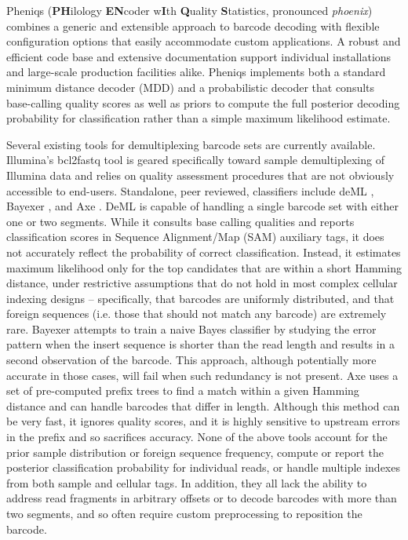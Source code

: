 \documentclass[twocolumn]{bmcart}
\begin{document}
Pheniqs (\textbf{PH}ilology \textbf{EN}coder w\textbf{I}th \textbf{Q}uality \textbf{S}tatistics, pronounced \textit{phoenix}) combines a generic and extensible approach to barcode decoding with flexible configuration options that easily accommodate custom applications. A robust and efficient code base and extensive documentation support individual installations and large-scale production facilities alike. Pheniqs implements both a standard minimum distance decoder (MDD) and a probabilistic decoder that consults base-calling quality scores as well as priors to compute the full posterior decoding probability for classification rather than a simple maximum likelihood estimate.

Several existing tools for demultiplexing barcode sets are currently available. Illumina's bcl2fastq tool is geared specifically toward sample demultiplexing of Illumina data and relies on quality assessment procedures that are not obviously accessible to end-users. Standalone, peer reviewed, classifiers include deML \cite{doi:10.1093/bioinformatics/btu719}, Bayexer \cite{doi:10.1093/bioinformatics/btv501}, and Axe \cite{doi:10.1093/bioinformatics/bty432}. DeML is capable of handling a single barcode set with either one or two segments. While it consults base calling qualities and reports classification scores in Sequence Alignment/Map (SAM) \cite{doi:10.1093/bioinformatics/btp352} auxiliary tags, it does not accurately reflect the probability of correct classification. Instead, it estimates maximum likelihood only for the top candidates that are within a short Hamming distance, under restrictive assumptions that do not hold in most complex cellular indexing designs -- specifically, that barcodes are uniformly distributed, and that foreign sequences (i.e. those that should not match any barcode) are extremely rare. Bayexer attempts to train a naive Bayes classifier by studying the error pattern when the insert sequence is shorter than the read length and results in a second observation of the barcode. This approach, although potentially more accurate in those cases, will fail when such redundancy is not present. Axe uses a set of pre-computed prefix trees to find a match within a given Hamming distance and can handle barcodes that differ in length. Although this method can be very fast, it ignores quality scores, and it is highly sensitive to upstream errors in the prefix and so sacrifices accuracy. None of the above tools account for the prior sample distribution or foreign sequence frequency, compute or report the posterior classification probability for individual reads, or handle multiple indexes from both sample and cellular tags. In addition, they all lack the ability to address read fragments in arbitrary offsets or to decode barcodes with more than two segments, and so often require custom preprocessing to reposition the barcode.
\end{document}

